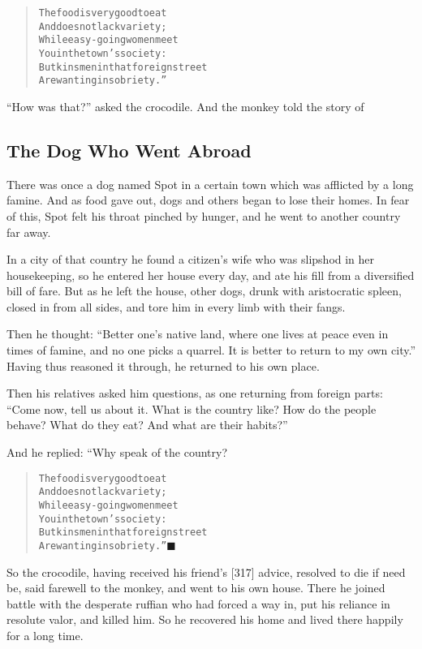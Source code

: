 \documentclass[article, twoside, 14pt]{memoir}
\newcommand{\qed}{\hfill \ensuremath{\blacksquare}}
\renewenvironment{verbatim}{%
\begin{quote}%
\vskip -10pt%
\begin{alltt}\normalfont\large}{\end{alltt}%
\end{quote}%
\vskip -10pt
} %
\begin{document}
\begin{verbatim}
The food is very good to eat
    And does not lack variety;
While easy-going women meet
    You in the town's society:
But kinsmen in that foreign street
    Are wanting in sobriety.”
\end{verbatim}
``How was that?'' asked the crocodile. And the monkey told the
story of

\subsection{The Dog Who Went Abroad}

\label{s77}

There was once a dog named Spot in a certain town which was
afflicted by a long famine. And as food gave out, dogs and others
began to lose their homes. In fear of this, Spot felt his throat
pinched by hunger, and he went to another country far away.

In a city of that country he found a citizen's wife who was
slipshod in her housekeeping, so he entered her house every day,
and ate his fill from a diversified bill of fare. But as he left
the house, other dogs, drunk with aristocratic spleen, closed in
from all sides, and tore him in every limb with their fangs.

Then he thought:
``Better one's native land, where one lives at peace even in times of famine, and no one picks a quarrel. It is better to return to my own city.''
Having thus reasoned it through, he returned to his own place.

Then his relatives asked him questions, as one returning from
foreign parts:
``Come now, tell us about it. What is the country like? How do the people behave? What do they eat? And what are their habits?''

And he replied: “Why speak of the country?

\begin{verbatim}
The food is very good to eat
    And does not lack variety;
While easy-going women meet
    You in the town's society:
But kinsmen in that foreign street
    Are wanting in sobriety.”\hyperref[s77]{\qed}
\end{verbatim}
So the crocodile, having received his friend's [317] advice,
resolved to die if need be, said farewell to the monkey, and went
to his own house. There he joined battle with the desperate ruffian
who had forced a way in, put his reliance in resolute valor, and
killed him. So he recovered his home and lived there happily for a
long time.
\end{document}
